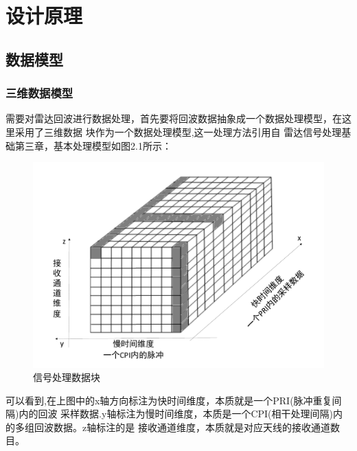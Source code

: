 \documentclass[a4paper,12pt]{report}
\begin{document}
\chapter{设计原理}
\begin{spacing}{1.5}
\songti{}

\section{数据模型}
\subsection{三维数据模型}
需要对雷达回波进行数据处理，首先要将回波数据抽象成一个数据处理模型，在这里采用了三维数据
块作为一个数据处理模型\cite{FundamentalsOfRadarSignalProcessing},这一处理方法引用自
雷达信号处理基础第三章，基本处理模型如图2.1所示：
\begin{figure}[hbtp]
    \centering
    \includegraphics [width=1.0\textwidth]{figure//DataBlock.pdf}
    \caption{信号处理数据块}\label{DataBlock}
\end{figure}

可以看到,在上图中的x轴方向标注为快时间维度，本质就是一个PRI(脉冲重复间隔)内的回波
采样数据.y轴标注为慢时间维度，本质是一个CPI(相干处理间隔)内的多组回波数据。z轴标注的是
接收通道维度，本质就是对应天线的接收通道数目。


\end{spacing}
\end{document}

